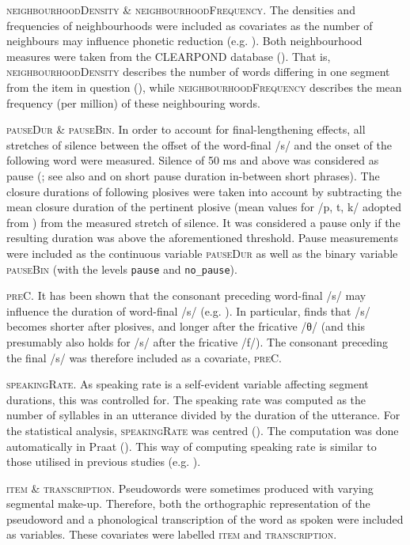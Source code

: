 \textsc{neighbourhoodDensity} \& \textsc{neighbourhoodFrequency}. The densities and frequencies of neighbourhoods were included as covariates as the number of neighbours may influence phonetic reduction (e.g. \cite{Gahl2012}). Both neighbourhood measures were taken from the CLEARPOND database (\cite{Marian2012}). That is, \textsc{neighbourhoodDensity} describes the number of words differing in one segment from the item in question (\cite[3]{Marian2012}), while \textsc{neighbourhoodFrequency} describes the mean frequency (per million) of these neighbouring words.

\textsc{pauseDur} \& \textsc{pauseBin}. In order to account for final-lengthening effects, all stretches of silence between the offset of the word-final /s/ and the onset of the following word were measured. Silence of 50 ms and above was considered as pause (\cite{Lee1999}; see also \cite{Zvonik2003} and \cite{Krivokapic2007} on short pause duration in-between short phrases). The closure durations of following plosives were taken into account by subtracting the mean closure duration of the pertinent plosive (mean values for /p, t, k/ adopted from \cite{Yao2007}) from the measured stretch of silence. It was considered a pause only if the resulting duration was above the aforementioned threshold. Pause measurements were included as the continuous variable \textsc{pauseDur} as well as the binary variable \textsc{pauseBin} (with the levels \texttt{pause} and \texttt{no\_pause}).

\textsc{preC}. It has been shown that the consonant preceding word-final /s/ may influence the duration of word-final /s/ (e.g. \cite{Umeda1977}). In particular, \citet[853]{Umeda1977} finds that /s/ becomes shorter after plosives, and longer after the fricative /θ/ (and this presumably also holds for /s/ after the fricative /f/). The consonant preceding the final /s/ was therefore included as a covariate, \textsc{preC}.

\textsc{speakingRate}. As speaking rate is a self-evident variable affecting segment durations, this was controlled for. The speaking rate was computed as the number of syllables in an utterance divided by the duration of the utterance. For the statistical analysis, \textsc{speakingRate} was centred (\cite{Robinson2009, Afshartous2011, Winter2019}). The computation was done automatically in Praat (\cite{deJong2008}). This way of computing speaking rate is similar to those utilised in previous studies (e.g. \cite{Plag2017}).

\textsc{item} \& \textsc{transcription}. Pseudowords were sometimes produced with varying segmental make-up. Therefore, both the orthographic representation of the pseudoword and a phonological transcription of the word as spoken were included as variables. These covariates were labelled \textsc{item} and \textsc{transcription}.

